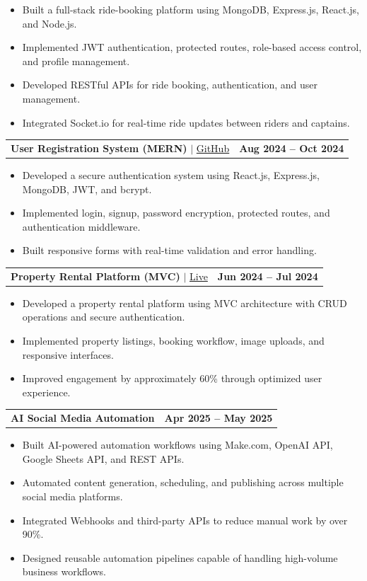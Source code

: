 \documentclass[letterpaper,11pt]{article}
\makeatletter
\newcommand{\resumeItem}[1]{
\item\small{{#1 \vspace{-2pt}}}
}
\newcommand{\resumeProjectHeading}[2]{
\item
\begin{tabular*}{1.001\textwidth}{l@{\extracolsep{\fill}}r}
\small #1 & \textbf{\small #2}\\
\end{tabular*}\vspace{-7pt}
}
\newcommand{\resumeItemListStart}{\begin{itemize}}
\newcommand{\resumeItemListEnd}{\end{itemize}\vspace{-5pt}}
\makeatother
\begin{document}
\resumeItemListStart
\resumeItem{Built a full-stack ride-booking platform using MongoDB, Express.js, React.js, and Node.js.}
\resumeItem{Implemented JWT authentication, protected routes, role-based access control, and profile management.}
\resumeItem{Developed RESTful APIs for ride booking, authentication, and user management.}
\resumeItem{Integrated Socket.io for real-time ride updates between riders and captains.}
\resumeItemListEnd

\vspace{-6pt}


\resumeProjectHeading
{\textbf{User Registration System (MERN)} $|$ \href{https://github.com/harshustle/RegForm}{GitHub}}
{Aug 2024 -- Oct 2024}

\resumeItemListStart
\resumeItem{Developed a secure authentication system using React.js, Express.js, MongoDB, JWT, and bcrypt.}
\resumeItem{Implemented login, signup, password encryption, protected routes, and authentication middleware.}
\resumeItem{Built responsive forms with real-time validation and error handling.}
\resumeItemListEnd

\vspace{-6pt}


\resumeProjectHeading
{\textbf{Property Rental Platform (MVC)} $|$ \href{https://wanderlust-3ie7.onrender.com/listings}{Live}}
{Jun 2024 -- Jul 2024}

\resumeItemListStart
\resumeItem{Developed a property rental platform using MVC architecture with CRUD operations and secure authentication.}
\resumeItem{Implemented property listings, booking workflow, image uploads, and responsive interfaces.}
\resumeItem{Improved engagement by approximately 60\% through optimized user experience.}
\resumeItemListEnd

\vspace{-6pt}


\resumeProjectHeading
{\textbf{AI Social Media Automation}}
{Apr 2025 -- May 2025}

\resumeItemListStart
\resumeItem{Built AI-powered automation workflows using Make.com, OpenAI API, Google Sheets API, and REST APIs.}
\resumeItem{Automated content generation, scheduling, and publishing across multiple social media platforms.}
\resumeItem{Integrated Webhooks and third-party APIs to reduce manual work by over 90\%.}
\resumeItem{Designed reusable automation pipelines capable of handling high-volume business workflows.}
\resumeItemListEnd
\end{document}
